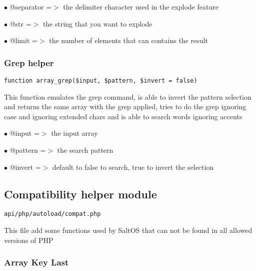 \documentclass[a4paper]{article}
\begin{document}
\begin{compactitem}
\item[\color{myblue}$\bullet$] @separator =$>$ the delimiter character used in the explode feature
\item[\color{myblue}$\bullet$] @str       =$>$ the string that you want to explode
\item[\color{myblue}$\bullet$] @limit     =$>$ the number of elements that can contains the result
\end{compactitem}

\hypertarget{toc73}{}
\subsubsection{Grep helper}

\begin{lstlisting}
function array_grep($input, $pattern, $invert = false)
\end{lstlisting}

This function emulates the grep command, is able to invert the pattern
selection and returns the same array with the grep applied, tries to do
the grep ignoring case and ignoring extended chars and is able to search
words ignoring accents

\begin{compactitem}
\item[\color{myblue}$\bullet$] @input   =$>$ the input array
\item[\color{myblue}$\bullet$] @pattern =$>$ the search pattern
\item[\color{myblue}$\bullet$] @invert  =$>$ default to false to search, true to invert the selection
\end{compactitem}

\hypertarget{toc74}{}
\subsection{Compatibility helper module}

\begin{lstlisting}
api/php/autoload/compat.php
\end{lstlisting}

This file add some functions used by SaltOS that can not be found in all allowed versions of PHP

\hypertarget{toc75}{}
\subsubsection{Array Key Last}
\end{document}
